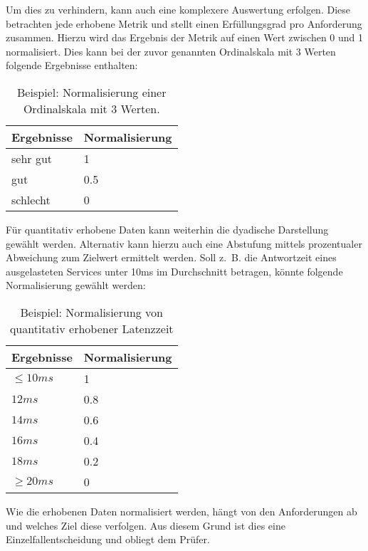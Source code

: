 Um dies zu verhindern, kann auch eine komplexere Auswertung erfolgen. Diese betrachten jede erhobene Metrik und stellt einen Erfüllungsgrad pro Anforderung zusammen. Hierzu wird das Ergebnis der Metrik auf einen Wert zwischen 0 und 1 normalisiert. Dies kann bei der zuvor genannten Ordinalskala mit 3 Werten folgende Ergebnisse enthalten:
  
\begin{table}[!h]
	\centering
	\begin{tabular}{ll}
		\textbf{Ergebnisse} & \textbf{Normalisierung}\\
		\hline
		sehr gut 	& 1  	\\
		\hline
		gut			& 0.5	\\
		\hline
		schlecht	& 0  	\\
		\hline
	\end{tabular}
	\caption[Ordinalskala Normalisierung]{Beispiel: Normalisierung einer Ordinalskala mit 3 Werten.}
	\label{Ordinalskala_Normalisierung}
\end{table}

Für quantitativ erhobene Daten kann weiterhin die dyadische Darstellung gewählt werden. Alternativ kann hierzu auch eine Abstufung mittels prozentualer Abweichung zum Zielwert ermittelt werden. Soll z.~B. die Antwortzeit eines ausgelasteten Services unter 10ms im Durchschnitt betragen, könnte folgende Normalisierung gewählt werden:

\begin{table}[!h]
	\centering
	\begin{tabular}{ll}
		\textbf{Ergebnisse} & \textbf{Normalisierung}\\
		\hline
		$\le 10ms$ 		& 1  	\\
		\hline
		$12ms$			& 0.8	\\
		\hline
		$14ms$			& 0.6  	\\
		\hline
		$16ms$			& 0.4  	\\
		\hline
		$18ms$			& 0.2  	\\
		\hline
		$\ge 20ms$		& 0  	\\
		\hline
	\end{tabular}
	\caption[Normalisierung quantitativer Daten]{Beispiel: Normalisierung von quantitativ erhobener Latenzzeit}
	\label{Normalisierung_quant}
\end{table}

Wie die erhobenen Daten normalisiert werden, hängt von den Anforderungen ab und welches Ziel diese verfolgen. Aus diesem Grund ist dies eine Einzelfallentscheidung und obliegt dem Prüfer.

